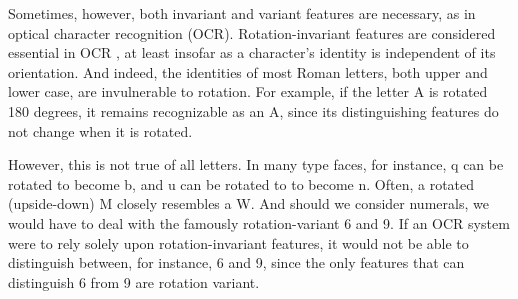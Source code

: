 

Sometimes, however, both invariant and variant features are necessary, 
as in optical character recognition (OCR)\citep{trier-et-al:1996}.
Rotation-invariant features are considered essential in OCR \citep{trier-et-al:1996}, 
at least
insofar as a character's identity is independent 
of its orientation.
And indeed, the identities of most Roman letters, both upper and lower case, are invulnerable to rotation.
For example, if the letter \textsf{A} is rotated 180 degrees, it remains 
recognizable as an \textsf{A}, since its distinguishing features do not change when it is rotated. 
 
However, this is not true of all letters. In many type faces, for instance, 
\textsf{q} can be rotated to become \textsf{b}, and \textsf{u} can be rotated to 
to become \textsf{n}. Often, a rotated (upside-down) \textsf{M} closely 
resembles a \textsf{W}. And should we consider numerals, we would have to deal 
with the famously rotation-variant \textsf{6} and \textsf{9}. If an 
OCR system were to rely solely upon rotation-invariant features, it
would not be able to distinguish between, for instance, \textsf{6} and 
\textsf{9}, since the only features that can distinguish \textsf{6} from \textsf{9}
are rotation variant.

